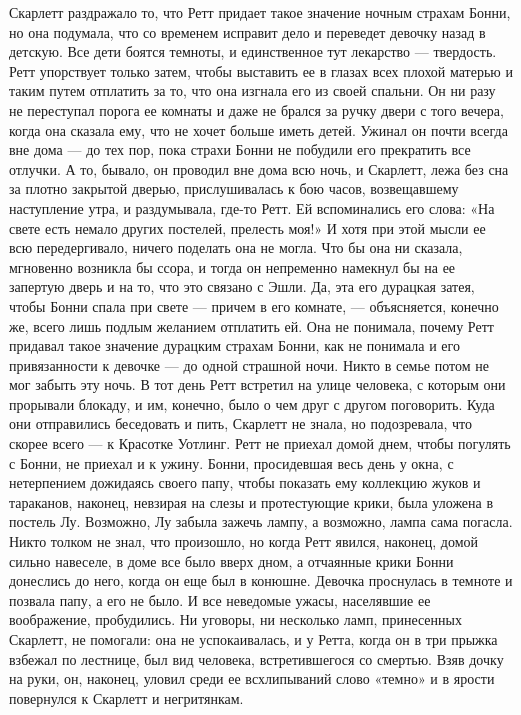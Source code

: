 Скарлетт раздражало то, что Ретт придает такое значение ночным страхам Бонни, но она подумала, что со временем исправит дело и переведет девочку назад в детскую. Все дети боятся темноты, и единственное тут лекарство — твердость. Ретт упорствует только затем, чтобы выставить ее в глазах всех плохой матерью и таким путем отплатить за то, что она изгнала его из своей спальни.
Он ни разу не переступал порога ее комнаты и даже не брался за ручку двери с того вечера, когда она сказала ему, что не хочет больше иметь детей. Ужинал он почти всегда вне дома — до тех пор, пока страхи Бонни не побудили его прекратить все отлучки. А то, бывало, он проводил вне дома всю ночь, и Скарлетт, лежа без сна за плотно закрытой дверью, прислушивалась к бою часов, возвещавшему наступление утра, и раздумывала, где-то Ретт. Ей вспоминались его слова: «На свете есть немало других постелей, прелесть моя!» И хотя при этой мысли ее всю передергивало, ничего поделать она не могла. Что бы она ни сказала, мгновенно возникла бы ссора, и тогда он непременно намекнул бы на ее запертую дверь и на то, что это связано с Эшли. Да, эта его дурацкая затея, чтобы Бонни спала при свете — причем в его комнате, — объясняется, конечно же, всего лишь подлым желанием отплатить ей.
Она не понимала, почему Ретт придавал такое значение дурацким страхам Бонни, как не понимала и его привязанности к девочке — до одной страшной ночи. Никто в семье потом не мог забыть эту ночь.
В тот день Ретт встретил на улице человека, с которым они прорывали блокаду, и им, конечно, было о чем друг с другом поговорить. Куда они отправились беседовать и пить, Скарлетт не знала, но подозревала, что скорее всего — к Красотке Уотлинг. Ретт не приехал домой днем, чтобы погулять с Бонни, не приехал и к ужину. Бонни, просидевшая весь день у окна, с нетерпением дожидаясь своего папу, чтобы показать ему коллекцию жуков и тараканов, наконец, невзирая на слезы и протестующие крики, была уложена в постель Лу.
Возможно, Лу забыла зажечь лампу, а возможно, лампа сама погасла. Никто толком не знал, что произошло, но когда Ретт явился, наконец, домой сильно навеселе, в доме все было вверх дном, а отчаянные крики Бонни донеслись до него, когда он еще был в конюшне. Девочка проснулась в темноте и позвала папу, а его не было. И все неведомые ужасы, населявшие ее воображение, пробудились. Ни уговоры, ни несколько ламп, принесенных Скарлетт, не помогали: она не успокаивалась, и у Ретта, когда он в три прыжка взбежал по лестнице, был вид человека, встретившегося со смертью.
Взяв дочку на руки, он, наконец, уловил среди ее всхлипываний слово «темно» и в ярости повернулся к Скарлетт и негритянкам.

